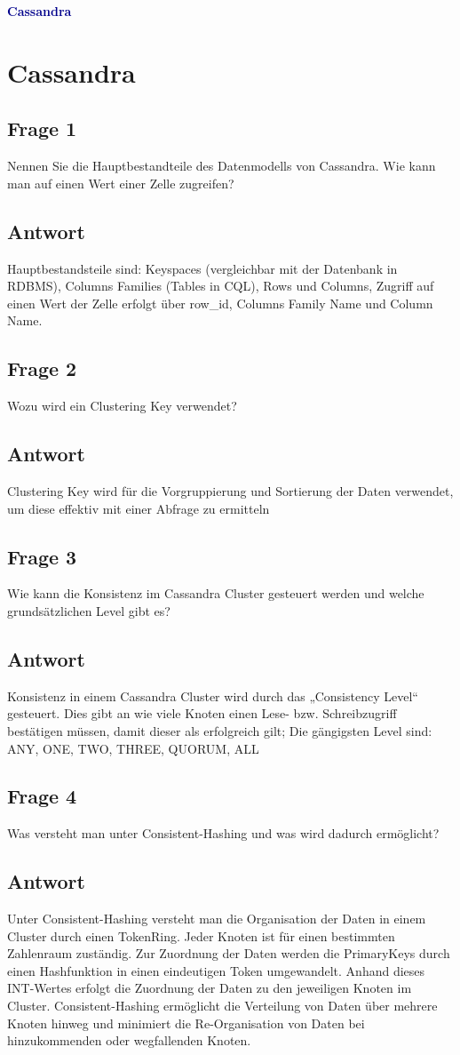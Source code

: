 \textbf{\textcolor{darkblue}{ Cassandra}}~

\section*{Cassandra}
\subsection*{Frage 1}
Nennen Sie die Hauptbestandteile des Datenmodells von Cassandra. Wie kann man auf einen Wert einer Zelle zugreifen?
\subsection*{Antwort}
Hauptbestandsteile sind: Keyspaces (vergleichbar mit der Datenbank in RDBMS), 
Columns Families (Tables in CQL), 
Rows und Columns, Zugriff auf einen Wert der Zelle erfolgt über row\_id, Columns Family Name und Column Name.
\subsection*{Frage 2}
Wozu wird ein Clustering Key verwendet?
\subsection*{Antwort}
Clustering Key wird für die Vorgruppierung und Sortierung der Daten verwendet, um diese effektiv mit einer Abfrage zu ermitteln
\subsection*{Frage 3}
Wie kann die Konsistenz im Cassandra Cluster gesteuert werden und welche grundsätzlichen Level gibt es?
\subsection*{Antwort}
Konsistenz in einem Cassandra Cluster wird durch das „Consistency Level“ gesteuert. Dies gibt an wie viele Knoten einen Lese- bzw. Schreibzugriff bestätigen müssen, damit dieser als erfolgreich gilt;
Die gängigsten Level sind: ANY, ONE, TWO, THREE, QUORUM, ALL

\subsection*{Frage 4}
Was versteht man unter Consistent-Hashing und was wird dadurch ermöglicht?
\subsection*{Antwort}
Unter Consistent-Hashing versteht man die Organisation der Daten in einem Cluster durch einen TokenRing. Jeder Knoten ist für einen bestimmten Zahlenraum zuständig. Zur Zuordnung der Daten werden die PrimaryKeys durch einen Hashfunktion in einen eindeutigen Token umgewandelt. Anhand dieses INT-Wertes erfolgt die Zuordnung der Daten zu den jeweiligen Knoten im Cluster. 
Consistent-Hashing ermöglicht die Verteilung von Daten über mehrere Knoten hinweg und minimiert die Re-Organisation von Daten bei hinzukommenden oder wegfallenden Knoten.
